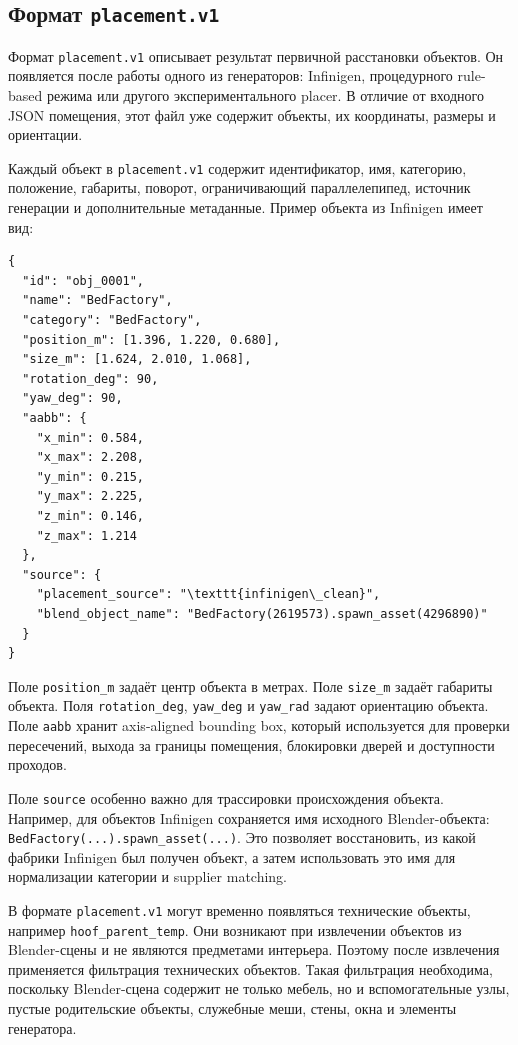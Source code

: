 \documentclass[times]{itmo-student-thesis}
\begin{document}
\subsection{Формат \texttt{placement.v1}}

Формат \texttt{placement.v1} описывает результат первичной расстановки объектов. Он появляется после работы одного из генераторов: Infinigen, процедурного rule-based режима или другого экспериментального placer. В отличие от входного JSON помещения, этот файл уже содержит объекты, их координаты, размеры и ориентации.

Каждый объект в \texttt{placement.v1} содержит идентификатор, имя, категорию, положение, габариты, поворот, ограничивающий параллелепипед, источник генерации и дополнительные метаданные. Пример объекта из Infinigen имеет вид:

\begin{lstlisting}[caption={Пример объекта в формате placement.v1}]
{
  "id": "obj_0001",
  "name": "BedFactory",
  "category": "BedFactory",
  "position_m": [1.396, 1.220, 0.680],
  "size_m": [1.624, 2.010, 1.068],
  "rotation_deg": 90,
  "yaw_deg": 90,
  "aabb": {
    "x_min": 0.584,
    "x_max": 2.208,
    "y_min": 0.215,
    "y_max": 2.225,
    "z_min": 0.146,
    "z_max": 1.214
  },
  "source": {
    "placement_source": "\texttt{infinigen\_clean}",
    "blend_object_name": "BedFactory(2619573).spawn_asset(4296890)"
  }
}
\end{lstlisting}

Поле \texttt{position\_m} задаёт центр объекта в метрах. Поле \texttt{size\_m} задаёт габариты объекта. Поля \texttt{rotation\_deg}, \texttt{yaw\_deg} и \texttt{yaw\_rad} задают ориентацию объекта. Поле \texttt{aabb} хранит axis-aligned bounding box, который используется для проверки пересечений, выхода за границы помещения, блокировки дверей и доступности проходов.

Поле \texttt{source} особенно важно для трассировки происхождения объекта. Например, для объектов Infinigen сохраняется имя исходного Blender-объекта: \texttt{BedFactory(...).spawn\_asset(...)}. Это позволяет восстановить, из какой фабрики Infinigen был получен объект, а затем использовать это имя для нормализации категории и supplier matching.

В формате \texttt{placement.v1} могут временно появляться технические объекты, например \texttt{hoof\_parent\_temp}. Они возникают при извлечении объектов из Blender-сцены и не являются предметами интерьера. Поэтому после извлечения применяется фильтрация технических объектов. Такая фильтрация необходима, поскольку Blender-сцена содержит не только мебель, но и вспомогательные узлы, пустые родительские объекты, служебные меши, стены, окна и элементы генератора.
\end{document}
